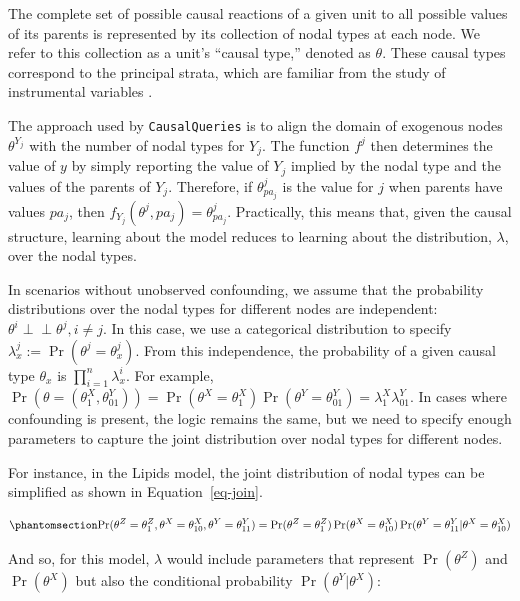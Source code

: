 \documentclass[
  11pt,
  article]{jss}
\begin{document}
The complete set of possible causal reactions of a given unit to all
possible values of its parents is represented by its collection of nodal
types at each node. We refer to this collection as a unit's ``causal
type,'' denoted as \(\theta\). These causal types correspond to the
principal strata, which are familiar from the study of instrumental
variables \citep{frangakis_principal_2002}.

The approach used by \texttt{CausalQueries} is to align the domain of
exogenous nodes \(\theta^{Y_j}\) with the number of nodal types for
\(Y_j\). The function \(f^j\) then determines the value of \(y\) by
simply reporting the value of \(Y_j\) implied by the nodal type and the
values of the parents of \(Y_j\). Therefore, if \(\theta^j_{pa_j}\) is
the value for \(j\) when parents have values \(pa_j\), then
\(f_{Y_j}(\theta^{j}, pa_j) = \theta^j_{pa_j}\). Practically, this means
that, given the causal structure, learning about the model reduces to
learning about the distribution, \(\lambda\), over the nodal types.

In scenarios without unobserved confounding, we assume that the
probability distributions over the nodal types for different nodes are
independent: \(\theta^i \perp\!\!\! \perp \theta^j, i\neq j\). In this
case, we use a categorical distribution to specify
\({\lambda^j_x} := \Pr(\theta^j = {\theta^j_x})\). From this
independence, the probability of a given causal type \(\theta_x\) is
\(\prod_{i=1}^n {\lambda^i_x}\). For example,
\(\Pr(\theta = (\theta^X_1, \theta^Y_{01})) = \Pr(\theta^X = \theta^X_1)\Pr(\theta^Y = \theta^Y_{01}) = \lambda^X_1\lambda^Y_{01}\).
In cases where confounding is present, the logic remains the same, but
we need to specify enough parameters to capture the joint distribution
over nodal types for different nodes.

For instance, in the Lipids model, the joint distribution of nodal types
can be simplified as shown in Equation~\ref{eq-join}.

\begin{equation}\phantomsection\label{eq-join}{
\Pr(\theta^Z = \theta^Z_1, \theta^X = \theta^X_{10}, \theta^Y = \theta^Y_{11}) = 
\Pr(\theta^Z = \theta^Z_1)\Pr(\theta^X = \theta^X_{10})\Pr(\theta^Y = \theta^Y_{11}|\theta^X = \theta^X_{10})
}\end{equation}

And so, for this model, \(\lambda\) would include parameters that
represent \(\Pr(\theta^Z)\) and \(\Pr(\theta^X)\) but also the
conditional probability \(\Pr(\theta^Y|\theta^X)\):
\end{document}
